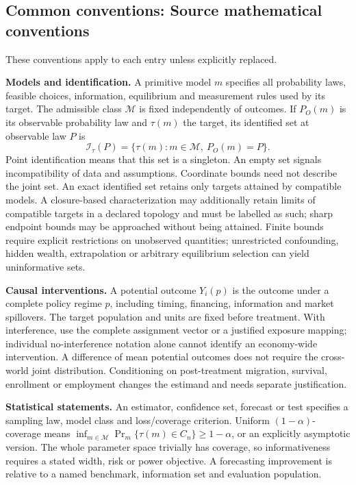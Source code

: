 \documentclass[11pt,a4paper]{article}
\begin{document}
\subsection*{Common conventions: Source mathematical conventions}

These conventions apply to each entry unless explicitly replaced.

\textbf{Models and identification.} A primitive model \(m\) specifies all probability laws, feasible choices, information, equilibrium and measurement rules used by its target. The admissible class \(\mathcal M\) is fixed independently of outcomes. If \(P_O(m)\) is its observable probability law and \(\tau(m)\) the target, its identified set at observable law \(P\) is
\[
 \mathcal I_\tau(P)=\{\tau(m):m\in\mathcal M,\ P_O(m)=P\}.
\]
Point identification means that this set is a singleton. An empty set signals incompatibility of data and assumptions. Coordinate bounds need not describe the joint set. An exact identified set retains only targets attained by compatible models. A closure-based characterization may additionally retain limits of compatible targets in a declared topology and must be labelled as such; sharp endpoint bounds may be approached without being attained. Finite bounds require explicit restrictions on unobserved quantities; unrestricted confounding, hidden wealth, extrapolation or arbitrary equilibrium selection can yield uninformative sets.

\textbf{Causal interventions.} A potential outcome \(Y_i(p)\) is the outcome under a complete policy regime \(p\), including timing, financing, information and market spillovers. The target population and units are fixed before treatment. With interference, use the complete assignment vector or a justified exposure mapping; individual no-interference notation alone cannot identify an economy-wide intervention. A difference of mean potential outcomes does not require the cross-world joint distribution. Conditioning on post-treatment migration, survival, enrollment or employment changes the estimand and needs separate justification.

\textbf{Statistical statements.} An estimator, confidence set, forecast or test specifies a sampling law, model class and loss/coverage criterion. Uniform \((1-\alpha)\)-coverage means \(\inf_{m\in\mathcal M}\Pr_m\{\tau(m)\in C_n\}\geq1-\alpha\), or an explicitly asymptotic version. The whole parameter space trivially has coverage, so informativeness requires a stated width, risk or power objective. A forecasting improvement is relative to a named benchmark, information set and evaluation population.
\end{document}
